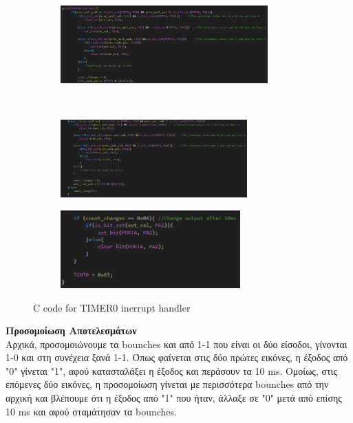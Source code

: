 \documentclass{article}
\begin{document}
	\pagebreak
	\begin{figure}[h!]
		\centering
		\begin{subfigure}[t]{0.5\textwidth}
			\centering
			\includegraphics[height=3cm, width=\linewidth]{./results/lab9_timer0_a_a.png}
		\end{subfigure}%
		~
		\begin{subfigure}[t]{0.5\textwidth}
			\centering
			\includegraphics[height=3cm, width=\linewidth]{./results/lab9_timer0_b_a.png}
		\end{subfigure}
		
		\begin{subfigure}[t]{0.5\textwidth}
			\centering
			\includegraphics[height=3cm, width=\linewidth]{./results/lab9_timer0_c_a.png}
		\end{subfigure}
		\caption{C code for TIMER0 inerrupt handler}
	\end{figure}

	\noindent
	\textbf{Προσομοίωση Αποτελεσμάτων} \\
	\noindent
	Αρχικά, προσομοιώνουμε τα bounches και από 1-1 που είναι οι δύο είσοδοι, γίνονται 1-0 και στη συνέχεια ξανά 1-1. Όπως φαίνεται στις δύο πρώτες εικόνες, η έξοδος από "0" γίνεται "1", αφού κατασταλάξει η έξοδος και περάσουν τα 10 ms. Ομοίως, στις επόμενες δύο εικόνες, η προσομοίωση γίνεται με περισσότερα bounches από την αρχική και βλέπουμε ότι η έξοδος από "1" που ήταν, άλλαξε σε "0" μετά από επίσης 10 ms και αφού σταμάτησαν τα bounches.
	
\end{document}
